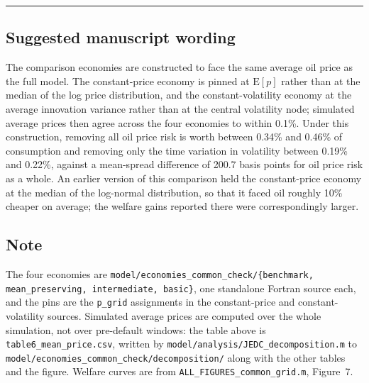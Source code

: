 \documentclass[11pt]{article}
\begin{document}
\bigskip
\hrule
\bigskip

\subsection*{Suggested manuscript wording}

\begin{shaded}
\noindent
The comparison economies are constructed to face the same average oil price as
the full model. The constant-price economy is pinned at $\mathrm{E}[p]$ rather
than at the median of the log price distribution, and the constant-volatility
economy at the average innovation variance rather than at the central volatility
node; simulated average prices then agree across the four economies to within
0.1\%. Under this construction, removing all oil price risk is worth between
0.34\% and 0.46\% of consumption and removing only the time variation in
volatility between 0.19\% and 0.22\%, against a mean-spread difference of 200.7
basis points for oil price risk as a whole. An earlier version of this
comparison held the constant-price economy at the median of the log-normal
distribution, so that it faced oil roughly 10\% cheaper on average; the welfare
gains reported there were correspondingly larger.
\end{shaded}

\subsection*{Note}

The four economies are \texttt{model/economies\_common\_check/\{benchmark,
mean\_preserving, intermediate, basic\}}, one standalone Fortran source each,
and the pins are the \texttt{p\_grid} assignments in the constant-price and
constant-volatility sources. Simulated average prices are computed over the
whole simulation, not over pre-default windows: the table above is
\texttt{table6\_mean\_price.csv}, written by
\texttt{model/analysis/JEDC\_decomposition.m} to
\texttt{model/economies\_common\_check/decomposition/} along with the other
tables and the figure. Welfare curves are from
\texttt{ALL\_FIGURES\_common\_grid.m}, Figure~7.

\end{document}
